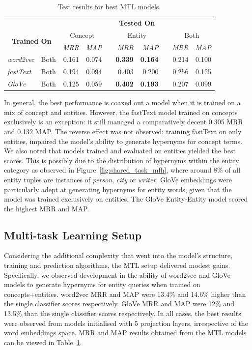 \begin{table}\centering
\begin{tabular}{@{}llrrcrrcrr@{}}\toprule
& & \multicolumn{8}{c}{\textbf{Tested On}}\\ 
\cmidrule{3-10}
\multicolumn{2}{c}{\multirow[c]{2}{*}{\textbf{Trained On}}} & \multicolumn{2}{c}{Concept} & \phantom{a} & \multicolumn{2}{c}{Entity} & \phantom{a} & \multicolumn{2}{c}{Both}\\ 
\multicolumn{2}{c}{} & \textit{MRR} & \textit{MAP} && \textit{MRR} & \textit{MAP} && \textit{MRR} & \textit{MAP}\\
\cmidrule{3-4} \cmidrule{6-7} \cmidrule{9-10}  
\textit{word2vec} & Both & 0.161 & 0.074 && \textbf{0.339} & \textbf{0.164} && 0.214 & 0.100 \\ 
\textit{fastText} & Both & 0.194 & 0.094 && 0.403 & 0.200 && 0.256 & 0.125\\ 
\textit{GloVe} & Both & 0.125 & 0.059 && \textbf{0.402} & \textbf{0.193} && 0.207 & 0.099\\ 
\bottomrule
\end{tabular}
\caption{Test results for best \ac{MTL} models.}\label{tab:semeval_mtl}
\end{table}

In general, the best performance is coaxed out a model when it is trained on a mix of concept and entities.  However, the fastText model trained on concepts exclusively is an exception: it still managed a comparatively decent 0.305 \ac{MRR} and 0.132 \ac{MAP}.  The reverse effect was not observed: training fastText on only entities, impaired the model's ability to generate hypernyms for concept terms.  We also noted that models trained and evaluated on entities yielded the best scores.  This is possibly due to the distribution of hypernyms within the entity category as observed in Figure~\ref{fig:shared_task_mfh}, where around 8\% of all entity tuples are instances of \textit{person}, \textit{city} or \textit{writer}.  GloVe embeddings were particularly adept at generating hypernyms for entity words, given that the model was trained exclusively on entities.  The GloVe Entity-Entity model scored the highest \ac{MRR} and \ac{MAP}.

\subsection{Multi-task Learning Setup}
Considering the additional complexity that went into the model's structure, training and prediction algorithms, the \ac{MTL} setup delivered modest gains.  Specifically, we observed development in the ability of word2vec and GloVe models to generate hypernyms for entity queries when trained on concepts+entities.  word2vec \ac{MRR} and \ac{MAP} were 13.4\%  and 14.6\% higher than the single classifier scores respectively.  GloVe \ac{MRR} and \ac{MAP} were 12\% and 13.5\% than the single classifier scores respectively.  In all cases, the best results were observed from models initialised with 5 projection layers, irrespective of the word embeddings space.  \ac{MRR} and \ac{MAP} results obtained from the \ac{MTL} models can be viewed in Table~\ref{tab:semeval_mtl}.

